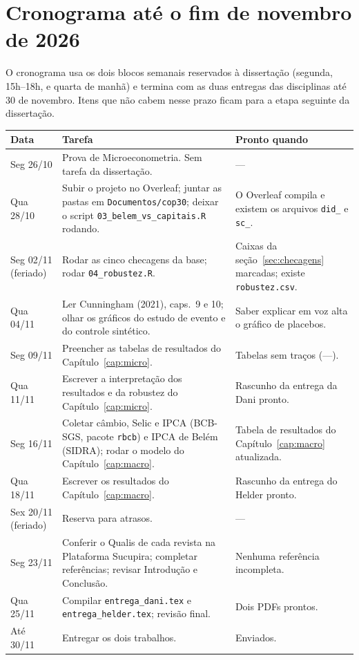 \chapter{Cronograma até o fim de novembro de 2026}\label{ap:plano}

O cronograma usa os dois blocos semanais reservados à dissertação (segunda, 15h--18h, e quarta de manhã)
e termina com as duas entregas das disciplinas até 30 de novembro. Itens que não cabem nesse prazo ficam
para a etapa seguinte da dissertação.

\begin{table}[H]
\centering\footnotesize
\begin{tabularx}{\linewidth}{>{\raggedright\arraybackslash}p{2.3cm}>{\raggedright\arraybackslash}X>{\raggedright\arraybackslash}p{4.2cm}}
\toprule
\textbf{Data} & \textbf{Tarefa} & \textbf{Pronto quando}\\
\midrule
Seg 26/10 & Prova de Microeconometria. Sem tarefa da dissertação. & ---\\
Qua 28/10 & Subir o projeto no Overleaf; juntar as pastas em \texttt{Documentos/cop30}; deixar o script \texttt{03\_belem\_vs\_capitais.R} rodando. & O Overleaf compila e existem os arquivos \texttt{did\_} e \texttt{sc\_}.\\
Seg 02/11 (feriado) & Rodar as cinco checagens da base; rodar \texttt{04\_robustez.R}. & Caixas da seção~\ref{sec:checagens} marcadas; existe \texttt{robustez.csv}.\\
Qua 04/11 & Ler Cunningham (2021), caps.\ 9 e 10; olhar os gráficos do estudo de evento e do controle sintético. & Saber explicar em voz alta o gráfico de placebos.\\
Seg 09/11 & Preencher as tabelas de resultados do Capítulo~\ref{cap:micro}. & Tabelas sem traços (---).\\
Qua 11/11 & Escrever a interpretação dos resultados e da robustez do Capítulo~\ref{cap:micro}. & Rascunho da entrega da Dani pronto.\\
Seg 16/11 & Coletar câmbio, Selic e IPCA (BCB-SGS, pacote \texttt{rbcb}) e IPCA de Belém (SIDRA); rodar o modelo do Capítulo~\ref{cap:macro}. & Tabela de resultados do Capítulo~\ref{cap:macro} atualizada.\\
Qua 18/11 & Escrever os resultados do Capítulo~\ref{cap:macro}. & Rascunho da entrega do Helder pronto.\\
Sex 20/11 (feriado) & Reserva para atrasos. & ---\\
Seg 23/11 & Conferir o Qualis de cada revista na Plataforma Sucupira; completar referências; revisar Introdução e Conclusão. & Nenhuma referência incompleta.\\
Qua 25/11 & Compilar \texttt{entrega\_dani.tex} e \texttt{entrega\_helder.tex}; revisão final. & Dois PDFs prontos.\\
Até 30/11 & Entregar os dois trabalhos. & Enviados.\\
\bottomrule
\end{tabularx}
\end{table}

